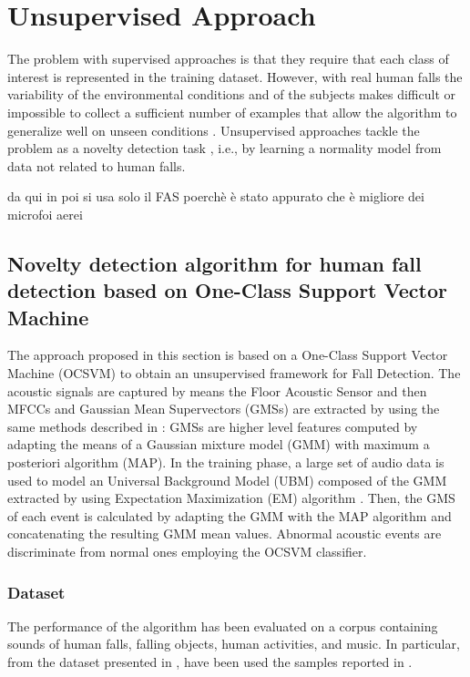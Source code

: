 \chapter{Unsupervised Approach}


The problem with supervised approaches is that they require that each class of interest is represented in the training dataset. However, with real human falls the variability of the environmental conditions and of the subjects makes difficult or impossible to collect a sufficient number of examples that allow the algorithm to generalize well on unseen conditions \cite{Noury2007}. Unsupervised approaches tackle the problem as a novelty detection task \cite{markou2003novelty1,markou2003novelty2}, i.e., by learning a normality model from data not related to human falls.


da qui in poi si usa solo il FAS poerchè è stato appurato che è migliore dei microfoi aerei

\section{Novelty detection algorithm for human fall detection based on One-Class Support Vector Machine}
\label{sec:ocsvm_approach}

The approach proposed in this section is based on a One-Class Support Vector Machine (OCSVM) \cite{scholkopf2000} to obtain an unsupervised framework for Fall Detection.
The acoustic signals are captured by means the Floor Acoustic Sensor and then MFCCs and Gaussian Mean Supervectors (GMSs) are extracted by using the same methods described in : GMSs are higher level features computed by adapting the means of a Gaussian mixture model (GMM) with maximum a posteriori algorithm (MAP).
In the training phase, a large set of audio data is used to model an Universal Background Model (UBM) composed of the GMM extracted by using Expectation Maximization (EM) algorithm \cite{bilmes1998gentle}.
Then, the GMS of each event is calculated by adapting the GMM with the MAP algorithm and concatenating the resulting GMM mean values.
Abnormal acoustic events are discriminate from normal ones employing the OCSVM classifier.


\subsection{Dataset}
\label{sec:dataset_cin_ocsvm_only}
The performance of the algorithm has been evaluated on a corpus containing sounds of human falls, falling objects, human activities, and music. In particular, from the dataset presented in , have been used the samples reported in .


